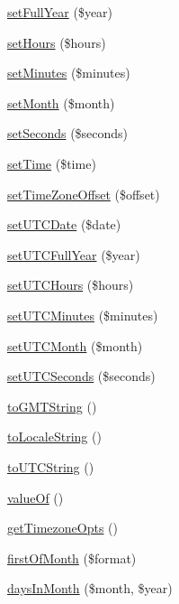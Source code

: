 \begin{DoxyCompactItemize}
\item 
\hyperlink{class_date_aeb9b455867f144c9b73521b39df623e8}{set\-Full\-Year} (\$year)
\item 
\hyperlink{class_date_ae3060c12575584e1882e4edccbe32e56}{set\-Hours} (\$hours)
\item 
\hyperlink{class_date_abceefbc75efb5b72f5df412f192cca10}{set\-Minutes} (\$minutes)
\item 
\hyperlink{class_date_a2d23f17188d59c2a59948658f514e404}{set\-Month} (\$month)
\item 
\hyperlink{class_date_a03af23ef78eb74c296585b7dcbf9cf00}{set\-Seconds} (\$seconds)
\item 
\hyperlink{class_date_ae4862c0e4322f18610dac18a0939d4b1}{set\-Time} (\$time)
\item 
\hyperlink{class_date_a6b8155e9d978c2a40782992133d7faf0}{set\-Time\-Zone\-Offset} (\$offset)
\item 
\hyperlink{class_date_a73acee1be57759160d7a7274cde043d1}{set\-U\-T\-C\-Date} (\$date)
\item 
\hyperlink{class_date_a370d9f0eadd95fbc9f277b1398d35679}{set\-U\-T\-C\-Full\-Year} (\$year)
\item 
\hyperlink{class_date_a9ab005420ee68b5b1712906700a110bf}{set\-U\-T\-C\-Hours} (\$hours)
\item 
\hyperlink{class_date_abeacea60ae16655708a7622a5cc88f33}{set\-U\-T\-C\-Minutes} (\$minutes)
\item 
\hyperlink{class_date_a7bb040011adb71dd569e6a48a141c08a}{set\-U\-T\-C\-Month} (\$month)
\item 
\hyperlink{class_date_a25f1ede432bded604a141668d8f96757}{set\-U\-T\-C\-Seconds} (\$seconds)
\item 
\hyperlink{class_date_a6967b7effc6b43f64de8c843491ab7c5}{to\-G\-M\-T\-String} ()
\item 
\hyperlink{class_date_a2c11bcc0df677096f1af22f1ae96eaf1}{to\-Locale\-String} ()
\item 
\hyperlink{class_date_a2484ff2934b07faa9c2ce3dadeb95690}{to\-U\-T\-C\-String} ()
\item 
\hyperlink{class_date_a14a7e9f7a2afd547fa8106fd1ef7af29}{value\-Of} ()
\item 
\hyperlink{class_date_a877ccfb1a58d9c47f2d53ea6e87fa135}{get\-Timezone\-Opts} ()
\item 
\hyperlink{class_date_af69efcb710f64fe85b1d3d5f026324c9}{first\-Of\-Month} (\$format)
\item 
\hyperlink{class_date_af2dfe6600a3f174ec1f16bee0ee39589}{days\-In\-Month} (\$month, \$year)

\end{DoxyCompactItemize}
